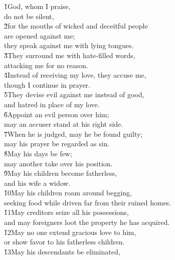 \begin{poetry}
\poeml \v{1}God, whom I praise, \\
\poemll    do not be silent, \\
\poeml \v{2}for the mouths of wicked and deceitful people \\
\poemll    are opened against me; \\
\poemlll       they speak against me with lying tongues. \\
\poeml \v{3}They surround me with hate-filled words, \\
\poemll    attacking me for no reason. \\
\poeml \v{4}Instead of receiving my love, they accuse me, \\
\poemll    though I continue in prayer. \\
\poeml \v{5}They devise evil against me instead of good, \\
\poemll    and hatred in place of my love. \\
\poeml \v{6}Appoint an evil person over him; \\
\poemll    may an accuser stand at his right side. \\
\poeml \v{7}When he is judged, may he be found guilty; \\
\poemll    may his prayer be regarded as sin. \\
\poeml \v{8}May his days be few; \\
\poemll    may another take over his position. \\
\poeml \v{9}May his children become fatherless, \\
\poemll    and his wife a widow. \\
\poeml \v{10}May his children roam around begging, \\
\poemll    seeking food while driven far from their ruined homes. \\
\poeml \v{11}May creditors seize all his possessions, \\
\poemll    and may foreigners loot the property he has acquired. \\
\poeml \v{12}May no one extend gracious love to him, \\
\poemll    or show favor to his fatherless children. \\
\poeml \v{13}May his descendants be eliminated, \\

\end{poetry}
